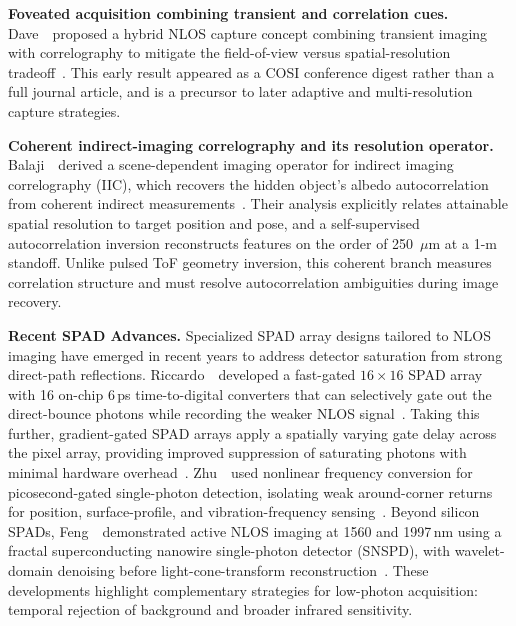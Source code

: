 \vspace{0.8mm}
\noindent \textbf{Foveated acquisition combining transient and correlation cues.}
Dave~\etal~proposed a hybrid NLOS capture concept combining transient imaging with correlography to mitigate the field-of-view versus spatial-resolution tradeoff~\cite{daveFoveatedNLOS2020}. This early result appeared as a COSI conference digest rather than a full journal article, and is a precursor to later adaptive and multi-resolution capture strategies.

\vspace{0.8mm}
\vspace{0.8mm}
\noindent \textbf{Coherent indirect-imaging correlography and its resolution operator.}
Balaji~\etal~derived a scene-dependent imaging operator for indirect imaging correlography (IIC), which recovers the hidden object's albedo autocorrelation from coherent indirect measurements~\cite{balajiIndirectCorrelographyOperator2023}. Their analysis explicitly relates attainable spatial resolution to target position and pose, and a self-supervised autocorrelation inversion reconstructs features on the order of 250~$\mu$m at a 1-m standoff. Unlike pulsed ToF geometry inversion, this coherent branch measures correlation structure and must resolve autocorrelation ambiguities during image recovery.

\noindent \textbf{Recent SPAD Advances.}
Specialized SPAD array designs tailored to NLOS imaging have emerged in recent years to address detector saturation from strong direct-path reflections. Riccardo~\etal~developed a fast-gated $16\times16$ SPAD array with 16 on-chip 6\,ps time-to-digital converters that can selectively gate out the direct-bounce photons while recording the weaker NLOS signal~\cite{riccardoFastGatedSPAD2022}. Taking this further, gradient-gated SPAD arrays apply a spatially varying gate delay across the pixel array, providing improved suppression of saturating photons with minimal hardware overhead~\cite{zhaoGradientGatedSPAD2023}. Zhu~\etal~used nonlinear frequency conversion for picosecond-gated single-photon detection, isolating weak around-corner returns for position, surface-profile, and vibration-frequency sensing~\cite{zhuSinglePhotonObscuredCorner2021}. Beyond silicon SPADs, Feng~\etal~demonstrated active NLOS imaging at 1560 and 1997\,nm using a fractal superconducting nanowire single-photon detector (SNSPD), with wavelet-domain denoising before light-cone-transform reconstruction~\cite{fengSNSPD2023}. These developments highlight complementary strategies for low-photon acquisition: temporal rejection of background and broader infrared sensitivity.

